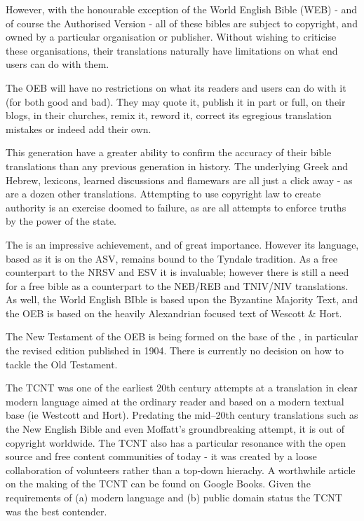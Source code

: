 However, with the honourable exception of the World English Bible
(WEB) - and of course the Authorised Version - all of these bibles
are subject to copyright, and owned by a particular organisation or
publisher. Without wishing to criticise these organisations, their
translations naturally have limitations on what end users can do
with them.

The OEB will have no restrictions on what its readers and users can
do with it (for both good and bad). They may quote it, publish it
in part or full, on their blogs, in their churches, remix it,
reword it, correct its egregious translation mistakes or indeed add
their own.


This generation have a greater ability to confirm the accuracy of
their bible translations than any previous generation in history.
The underlying Greek and Hebrew, lexicons, learned discussions and
flamewars are all just a click away - as are a dozen other
translations. Attempting to use copyright law to create authority
is an exercise doomed to failure, as are all attempts to enforce
truths by the power of the state.


The
\from[1]
is an impressive achievement, and of great importance. However its
language, based as it is on the ASV, remains bound to the Tyndale
tradition. As a free counterpart to the NRSV and ESV it is
invaluable; however there is still a need for a free bible as a
counterpart to the NEB/REB and TNIV/NIV translations. As well, the
World English BIble is based upon the Byzantine Majority Text, and
the OEB is based on the heavily Alexandrian focused text of Wescott
\& Hort.


The New Testament of the OEB is being formed on the base of the
, in particular the
revised edition published in 1904. There is currently no decision
on how to tackle the Old Testament.


The TCNT was one of the earliest 20th century attempts at a
translation in clear modern language aimed at the ordinary reader
and based on a modern textual base (ie Westcott and Hort).
Predating the mid--20th century translations such as the New
English Bible and even Moffatt's groundbreaking attempt, it is out
of copyright worldwide. The TCNT also has a particular resonance
with the open source and free content communities of today - it was
created by a loose collaboration of volunteers rather than a
top-down hierachy. A worthwhile article on the making of the TCNT
can be found on Google Books. Given the requirements of (a) modern
language and (b) public domain status the TCNT was the best
contender.

